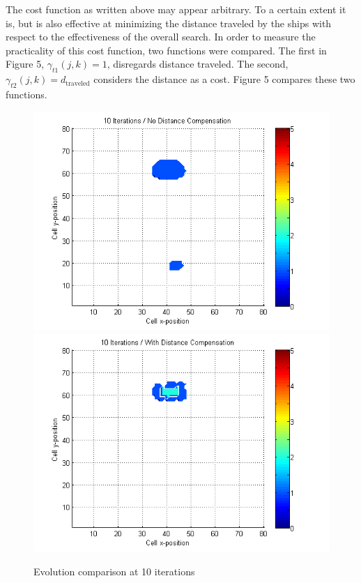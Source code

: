 \documentclass[a4paper]{article}
\begin{document}
The cost function as written above may appear arbitrary. To a certain extent it is, but is also effective at minimizing the distance traveled by the ships with respect to the effectiveness of the overall search. In order to measure the practicality of this cost function, two functions were compared. The first in Figure 5, $\gamma_{t1}(j,k)=1$, disregards distance traveled. The second, $\gamma_{t2}(j,k)=d_{\mbox{traveled}}$ considers the distance as a cost. Figure 5 compares these two functions.

\begin{figure}[H]\begin{center}
\includegraphics[scale=0.45]{../Matlab/Images/SearchCountNoDist010.png}
\includegraphics[scale=0.45]{../Matlab/Images/SearchCountDist010.png}
\caption{Evolution comparison at 10 iterations}
\end{center}\end{figure}
\end{document}
